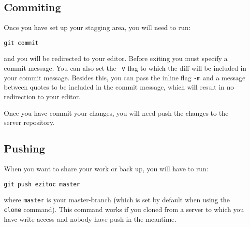 \documentclass[a4paper,12pt]{article}
\begin{document}
\subsection{Commiting}
Once you have set up your stagging area, you will need to run:
\begin{lstlisting}[style=input]
git commit
\end{lstlisting}
and you will be redirected to your editor. Before exiting you must specify a
commit message. You can also set the \texttt{-v} flag to which the diff will
be included in your commit message. Besides this, you can pass the inline flag
\texttt{-m} and a message between quotes to be included in the commit message,
which will result in no redirection to your editor.

Once you have commit your changes, you will need push the changes to the
server repository. 

\subsection{Pushing}
When you want to share your work or back up, you will have to run:
\begin{lstlisting}[style=input]
git push ezitoc master
\end{lstlisting}
where \texttt{master} is your master-branch (which is set by default when
using the \texttt{clone} command). This command works if you cloned from a
server to which you have write access and nobody have push in the meantime.
\end{document}

